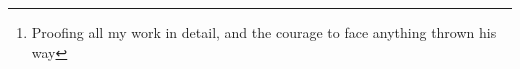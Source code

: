 \author{Philip 
    \thanks{Proofing all my work in detail, and the courage to face anything thrown his way}
}
